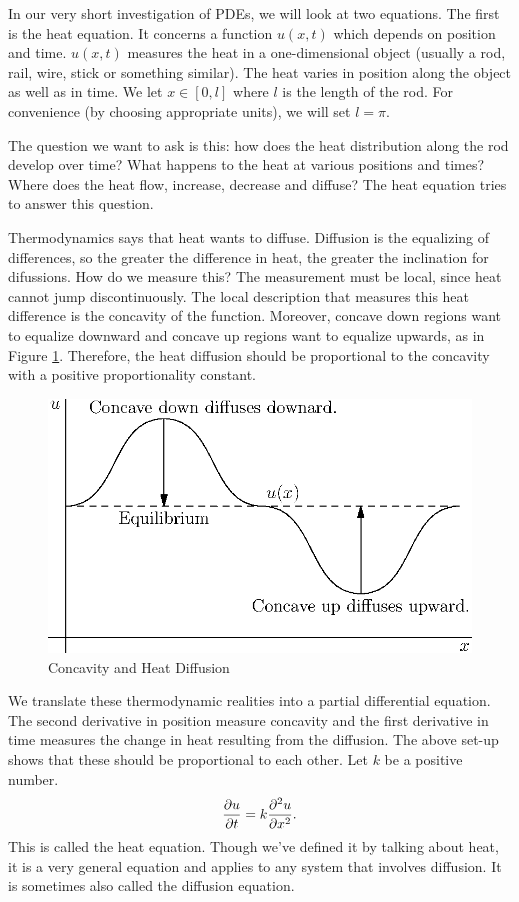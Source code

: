 \documentclass[fleqn,letterpaper]{report}
\begin{document}
In our very short investigation of PDEs, we will look at two
equations. The first is the heat equation. It concerns a
function $u(x,t)$ which depends on position and time.
$u(x,t)$ measures the heat in a one-dimensional object (usually
a rod, rail, wire, stick or something similar). The heat varies in
position along the object as well as in time. We let $x \in [0,l]$
where $l$ is the length of the rod. For convenience (by
choosing appropriate units), we will set $l = \pi$.

The question we want to ask is this: how does the heat
distribution along the rod develop over time? What happens to
the heat at various positions and times? Where does the heat
flow, increase, decrease and diffuse? The heat
equation tries to answer this question. 

Thermodynamics says that heat wants to diffuse. Diffusion is
the equalizing of differences, so the greater the difference
in heat, the greater the inclination for difussions. How do
we measure this? The measurement must be local, since heat
cannot jump discontinuously. The local description that
measures this heat difference is the concavity of the
function. Moreover, concave down regions want to equalize
downward and concave up regions want to equalize upwards, as
in Figure \ref{figure-heat-equation}.
Therefore, the heat diffusion should be proportional to the
concavity with a positive proportionality constant.

\begin{figure}[t]
\centering
\includegraphics[width=12cm]{figure40.eps}
\caption{Concavity and Heat Diffusion}
\label{figure-heat-equation}
\end{figure}

We translate these thermodynamic realities into a partial
differential equation. The second derivative in position
measure concavity and the first derivative in time measures the
change in heat resulting from the diffusion. The above set-up
shows that these should be proportional to each other. Let $k$
be a positive number.
\begin{equation*}
\frac{\partial u}{\partial t} = k \frac{\partial^2 u}{\partial x^2}.
\end{equation*}
This is called the heat equation. Though we've defined it by
talking about heat, it is a very general equation and applies
to any system that involves diffusion. It is sometimes also
called the diffusion equation.
\end{document}
